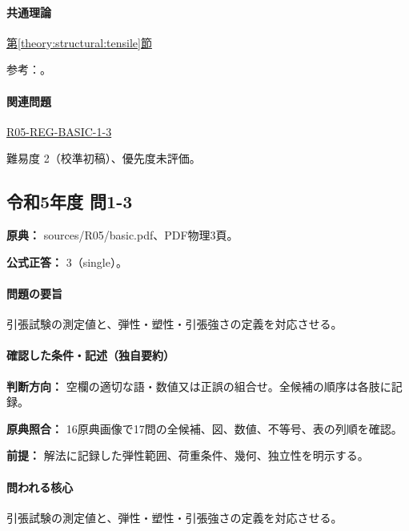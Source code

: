 \paragraph{共通理論} \hyperref[theory:structural:tensile]{第\ref*{theory:structural:tensile}節}

\par 参考：\cite{struct_mit_beam,struct_mit_buckling,struct_mlit_limit}。

\paragraph{関連問題} \hyperref[q:r05-reg-basic-1-3]{R05-REG-BASIC-1-3}

\par 難易度 2（校準初稿）、優先度未評価。

\subsection{令和5年度 問1-3}
\label{q:r05-reg-basic-1-3}

\noindent\textbf{原典：} sources/R05/basic.pdf、PDF物理3頁。

\textbf{公式正答：} 3（single）。

\paragraph{問題の要旨} 引張試験の測定値と、弾性・塑性・引張強さの定義を対応させる。

\paragraph{確認した条件・記述（独自要約）}\mbox{}\par

\noindent\textbf{判断方向：} 空欄の適切な語・数値又は正誤の組合せ。全候補の順序は各肢に記録。\par

\noindent\textbf{原典照合：} 16原典画像で17問の全候補、図、数値、不等号、表の列順を確認。\par

\noindent\textbf{前提：} 解法に記録した弾性範囲、荷重条件、幾何、独立性を明示する。\par

\paragraph{問われる核心} 引張試験の測定値と、弾性・塑性・引張強さの定義を対応させる。

